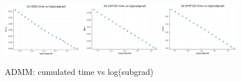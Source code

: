 \documentclass{article}
\begin{document}
\begin{figure}[H]
{\begin{minipage}[b]{1\textwidth}
   		 	\includegraphics[width=0.3\textwidth]{Interior Point Method/subgradplot2_fig/1dtimevslogsubgrad.png}		 	\includegraphics[width=0.3\textwidth]{Interior Point Method/subgradplot2_fig/2dtimevslogsubgrad.png}           \includegraphics[width=0.3\textwidth]{Interior Point Method/subgradplot2_fig/3dtimevslogsubgrad.png}
    		\end{minipage}
      \caption{ADMM: cumulated time vs log(subgrad)}
		}
\end{figure}
\end{document}
